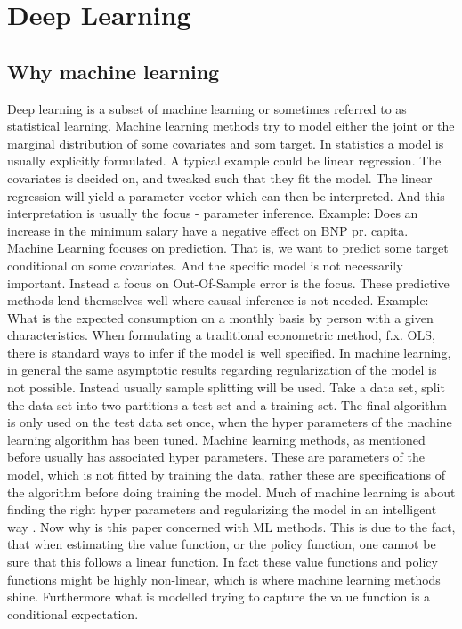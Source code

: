 \section{Deep Learning}
\label{sec:deep_learning}


\subsection{Why machine learning}

Deep learning is a subset of machine learning or sometimes referred to as statistical learning. Machine learning methods try to model either the joint or the marginal distribution of some covariates and som target. In statistics a model is usually explicitly formulated. A typical example could be linear regression. The covariates is decided on, and tweaked such that they fit the model. The linear regression will yield a parameter vector which can then be interpreted. And this interpretation is usually the focus - parameter inference. Example: Does an increase in the minimum salary have a negative effect on BNP pr. capita. Machine Learning focuses on prediction. That is, we want to predict some target conditional on some covariates. And the specific model is not necessarily important. Instead a focus on Out-Of-Sample error is the focus. These predictive methods lend themselves well where causal inference is not needed. Example: What is the expected consumption on a monthly basis by person with a given characteristics. When formulating a traditional econometric method, f.x. OLS, there is standard ways to infer if the model is well specified. In machine learning, in general the same asymptotic results regarding regularization of the model is not possible. Instead usually sample splitting will be used. Take a data set, split the data set into two partitions a test set and a training set. The final algorithm is only used on the test data set once, when the hyper parameters of the machine learning algorithm has been tuned. Machine learning methods, as mentioned before usually has associated hyper parameters. These are parameters of the model, which is not fitted by training the data, rather these are specifications of the algorithm before doing training the model. Much of machine learning is about finding the right hyper parameters and regularizing the model in an intelligent way \parencite{friedman_elements_2001}. Now why is this paper concerned with ML methods. This is due to the fact, that when estimating the value function, or the policy function, one cannot be sure that this follows a linear function. In fact these value functions and policy functions might be highly non-linear, which is where machine learning methods shine. Furthermore what is modelled trying to capture the value function is a conditional expectation.

